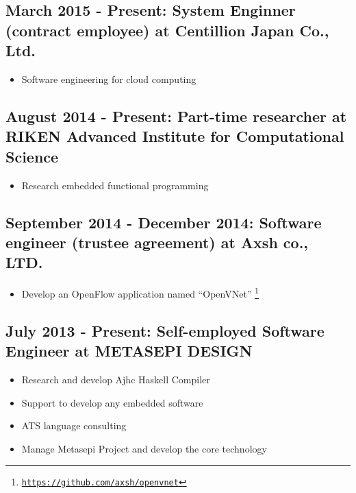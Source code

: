 \documentclass[letterpaper]{article}
\begin{document}
\subsection*{March 2015 - Present: System Enginner (contract employee) at Centillion Japan Co., Ltd.}

\begin{itemize}
  \item Software engineering for cloud computing
\end{itemize}

\subsection*{August 2014 - Present: Part-time researcher at RIKEN Advanced Institute for Computational Science}

\begin{itemize}
  \item Research embedded functional programming
\end{itemize}

\subsection*{September 2014 - December 2014: Software engineer (trustee agreement) at Axsh co., LTD.}

\begin{itemize}
  \item Develop an OpenFlow application named ``OpenVNet'' \footnote{\href{https://github.com/axsh/openvnet}{\tt https://github.com/axsh/openvnet}}
\end{itemize}

\subsection*{July 2013 - Present: Self-employed Software Engineer at METASEPI DESIGN}

\begin{itemize}
  \item Research and develop Ajhc Haskell Compiler
  \item Support to develop any embedded software
  \item ATS language consulting
  \item Manage Metasepi Project and develop the core technology
\end{itemize}

\end{document}
